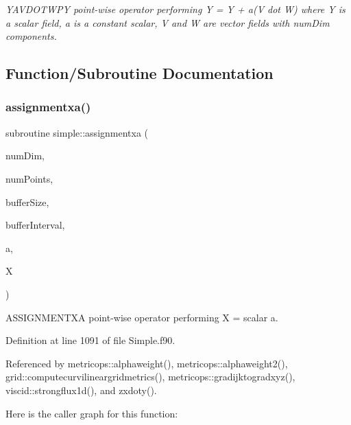 \begin{DoxyCompactItemize}
\begin{DoxyCompactList}\small\item\em Y\+A\+V\+D\+O\+T\+W\+PY point-\/wise operator performing Y = Y + a(\+V dot W) where Y is a scalar field, a is a constant scalar, V and W are vector fields with num\+Dim components. \end{DoxyCompactList}\end{DoxyCompactItemize}


\subsection{Function/\+Subroutine Documentation}
\hypertarget{namespacesimple_a82c25cd0c1d999c2c6028a3bdce656a0}{}\label{namespacesimple_a82c25cd0c1d999c2c6028a3bdce656a0} 
\subsubsection{\texorpdfstring{assignmentxa()}{assignmentxa()}}
{\footnotesize\ttfamily subroutine simple\+::assignmentxa (\begin{DoxyParamCaption}\item[{integer(kind=4), intent(in)}]{num\+Dim,  }\item[{integer(kind=8), intent(in)}]{num\+Points,  }\item[{integer(kind=8), dimension(numdim), intent(in)}]{buffer\+Size,  }\item[{integer(kind=8), dimension(2$\ast$numdim), intent(in)}]{buffer\+Interval,  }\item[{real(kind=8), intent(in)}]{a,  }\item[{real(kind=8), dimension(numpoints), intent(inout)}]{X }\end{DoxyParamCaption})}



A\+S\+S\+I\+G\+N\+M\+E\+N\+T\+XA point-\/wise operator performing X = scalar a. 



Definition at line 1091 of file Simple.\+f90.



Referenced by metricops\+::alphaweight(), metricops\+::alphaweight2(), grid\+::computecurvilineargridmetrics(), metricops\+::gradijktogradxyz(), viscid\+::strongflux1d(), and zxdoty().

Here is the caller graph for this function\+:
\hypertarget{namespacesimple_ad0ea6bd7b10922952850fd3704ce06cb}{}\label{namespacesimple_ad0ea6bd7b10922952850fd3704ce06cb} 
